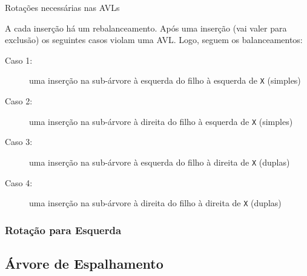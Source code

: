 \begin{frame}

\begin{block}{Rotações necessárias nas AVLs}

A cada inserção há um rebalanceamento. Após uma inserção (vai valer para exclusão) os seguintes
casos violam uma AVL. Logo, seguem os balanceamentos:
\begin{description}
 \item[Caso 1:] uma inserção na sub-árvore à esquerda do filho à esquerda de  \texttt{X} (simples)
 \item[Caso 2:] uma inserção na sub-árvore à direita do filho à esquerda de  \texttt{X} (simples)
 \item[Caso 3:] uma inserção na sub-árvore à esquerda do filho à direita de  \texttt{X} (duplas)    
 \item[Caso 4:] uma inserção na sub-árvore à direita do filho à direita de  \texttt{X} (duplas)        
\end{description}
\end{block}


\end{frame}




\begin{frame}
    \frametitle{Rotação para Esquerda}
  
    
    \begin{figure}[tbp]
    \centering
    \end{figure}
\end{frame}




\subsection{Árvore de Espalhamento}


